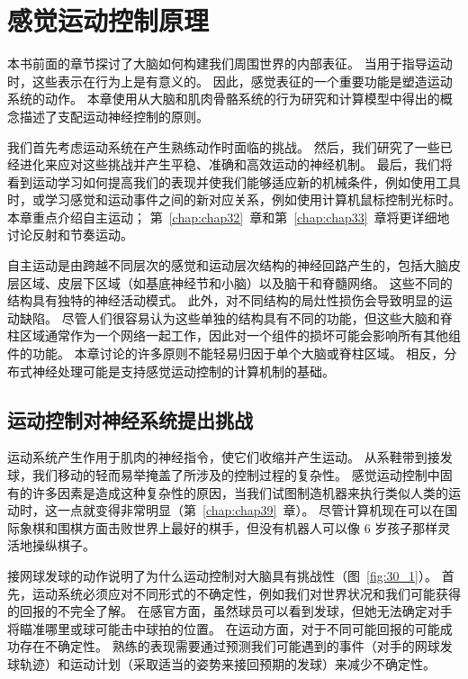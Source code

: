 \chapter{感觉运动控制原理} \label{chap:chap30}

本书前面的章节探讨了大脑如何构建我们周围世界的内部表征。
当用于指导运动时，这些表示在行为上是有意义的。
因此，感觉表征的一个重要功能是塑造运动系统的动作。 
本章使用从大脑和肌肉骨骼系统的行为研究和计算模型中得出的概念描述了支配运动神经控制的原则。


我们首先考虑运动系统在产生熟练动作时面临的挑战。
然后，我们研究了一些已经进化来应对这些挑战并产生平稳、准确和高效运动的神经机制。
最后，我们将看到运动学习如何提高我们的表现并使我们能够适应新的机械条件，例如使用工具时，或学习感觉和运动事件之间的新对应关系，例如使用计算机鼠标控制光标时。
本章重点介绍自主运动；
第~\ref{chap:chap32}~章和第~\ref{chap:chap33}~章将更详细地讨论反射和节奏运动。


自主运动是由跨越不同层次的感觉和运动层次结构的神经回路产生的，包括大脑皮层区域、皮层下区域（如基底神经节和小脑）以及脑干和脊髓网络。
这些不同的结构具有独特的神经活动模式。
此外，对不同结构的局灶性损伤会导致明显的运动缺陷。 
尽管人们很容易认为这些单独的结构具有不同的功能，但这些大脑和脊柱区域通常作为一个网络一起工作，因此对一个组件的损坏可能会影响所有其他组件的功能。
本章讨论的许多原则不能轻易归因于单个大脑或脊柱区域。
相反，分布式神经处理可能是支持感觉运动控制的计算机制的基础。



\section{运动控制对神经系统提出挑战}

运动系统产生作用于肌肉的神经指令，使它们收缩并产生运动。
从系鞋带到接发球，我们移动的轻而易举掩盖了所涉及的控制过程的复杂性。
感觉运动控制中固有的许多因素是造成这种复杂性的原因，当我们试图制造机器来执行类似人类的运动时，这一点就变得非常明显（第~\ref{chap:chap39}~章）。 
尽管计算机现在可以在国际象棋和围棋方面击败世界上最好的棋手，但没有机器人可以像 6 岁孩子那样灵活地操纵棋子。


接网球发球的动作说明了为什么运动控制对大脑具有挑战性（图~\ref{fig:30_1}）。
首先，运动系统必须应对不同形式的不确定性，例如我们对世界状况和我们可能获得的回报的不完全了解。
在感官方面，虽然球员可以看到发球，但她无法确定对手将瞄准哪里或球可能击中球拍的位置。
在运动方面，对于不同可能回报的可能成功存在不确定性。
熟练的表现需要通过预测我们可能遇到的事件（对手的网球发球轨迹）和运动计划（采取适当的姿势来接回预期的发球）来减少不确定性。


